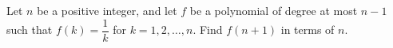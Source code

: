 Let $n$ be a positive integer, and let $f$ be a polynomial of degree at most $n-1$ such that $f(k)=\dfrac1k$ for $k=1,2,\dots,n$. Find $f(n+1)$ in terms of $n$.
